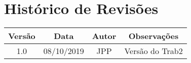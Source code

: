 \chapter*{Histórico de Revisões}

\begin{center}
    \begin{tabular}{|c|c|c|c|}
        \hline
        Versão & Data       & Autor & Observações                                      \\
        \hline
        1.0    & 08/10/2019 & JPP   & Versão do Trab2                                  \\
        \hline
    \end{tabular}
\end{center}
